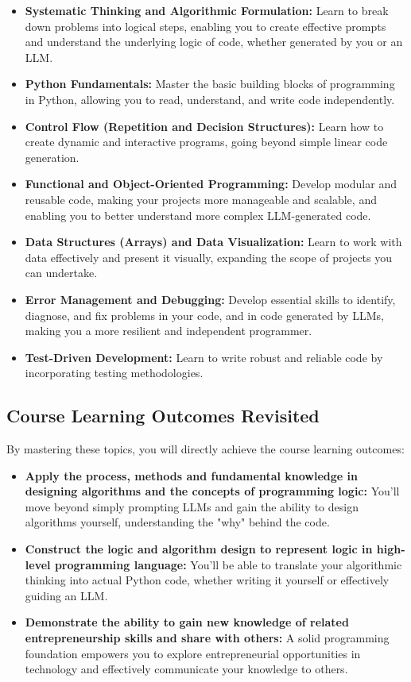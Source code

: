 \begin{itemize}
    \item \textbf{Systematic Thinking and Algorithmic Formulation:}  Learn to break down problems into logical steps, enabling you to create effective prompts and understand the underlying logic of code, whether generated by you or an LLM.
    \item \textbf{Python Fundamentals:}  Master the basic building blocks of programming in Python, allowing you to read, understand, and write code independently.
    \item \textbf{Control Flow (Repetition and Decision Structures):}  Learn how to create dynamic and interactive programs, going beyond simple linear code generation.
    \item \textbf{Functional and Object-Oriented Programming:}  Develop modular and reusable code, making your projects more manageable and scalable, and enabling you to better understand more complex LLM-generated code.
    \item \textbf{Data Structures (Arrays) and Data Visualization:} Learn to work with data effectively and present it visually, expanding the scope of projects you can undertake.
    \item \textbf{Error Management and Debugging:}  Develop essential skills to identify, diagnose, and fix problems in your code, and in code generated by LLMs, making you a more resilient and independent programmer.
    \item \textbf{Test-Driven Development:} Learn to write robust and reliable code by incorporating testing methodologies.
\end{itemize}

\newpage
\subsection{Course Learning Outcomes Revisited}

By mastering these topics, you will directly achieve the course learning outcomes:

\begin{itemize}
    \item \textbf{Apply the process, methods and fundamental knowledge in designing algorithms and the concepts of programming logic:} You'll move beyond simply prompting LLMs and gain the ability to design algorithms yourself, understanding the "why" behind the code.
    \item \textbf{Construct the logic and algorithm design to represent logic in high-level programming language:} You'll be able to translate your algorithmic thinking into actual Python code, whether writing it yourself or effectively guiding an LLM.
    \item \textbf{Demonstrate the ability to gain new knowledge of related entrepreneurship skills and share with others:}  A solid programming foundation empowers you to explore entrepreneurial opportunities in technology and effectively communicate your knowledge to others.
\end{itemize}

